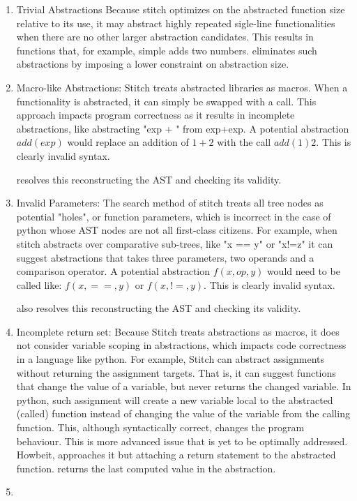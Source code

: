 \begin{enumerate}
    \item Trivial Abstractions
    Because stitch optimizes on the abstracted function size relative to its use, it may abstract highly repeated sigle-line functionalities when there are no other larger abstraction candidates. This results in functions that, for example, simple adds two numbers. \toolname eliminates such abstractions by imposing a lower constraint on abstraction size.
    \item Macro-like Abstractions: 
    Stitch treats abstracted libraries as macros. When a functionality is abstracted, it can simply be swapped with a call. This approach impacts program correctness as it results in incomplete abstractions, like abstracting "exp + " from exp+exp. A potential abstraction $add(exp)$ would replace an addition of $1+2$ with the call $add(1) 2$. This is clearly invalid syntax.
    
    \toolname resolves this reconstructing the AST and checking its validity. 
    \item Invalid Parameters:
    The search method of stitch treats all tree nodes as potential "holes", or function parameters, which is incorrect in the case of python whose AST nodes are not all first-class citizens. For example, when stitch abstracts over comparative sub-trees, like "x == y" or "x!=z" it can suggest abstractions that takes three parameters, two operands and a comparison operator. A potential abstraction $f(x,op,y)$ would need to be called like: $f(x, ==, y)$ or $f(x, !=, y)$. This is clearly invalid syntax.
    
    \toolname also resolves this reconstructing the AST and checking its validity. 
    \item Incomplete return set:
    Because Stitch treats abstractions as macros, it does not consider variable scoping in abstractions, which impacts code correctness in a language like python. For example, Stitch can abstract assignments without returning the assignment targets. That is, it can suggest functions that change the value of a variable, but never returns the changed variable. In python, such assignment will create a new variable local to the abstracted (called) function instead of changing the value of the variable from the calling function. This, although syntactically correct, changes the program behaviour. This is more advanced issue that is yet to be optimally addressed. Howbeit, \toolname approaches it but attaching a return statement to the abstracted function. \toolname returns the last computed value in the abstraction.
    \item {}
\end{enumerate}

